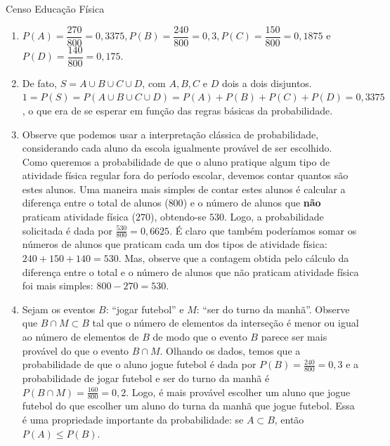 \begin{answer}{Censo Educação Física}
{
\begin{enumerate}
\item $P(A)=\dfrac{270}{800}=0{,}3375, P(B)=\dfrac{240}{800}=0{,}3, P(C)=\dfrac{150}{800}=0{,}1875$ e $P(D)=\dfrac{140}{800}=0{,}175$.

\item De fato, $S=A\cup B\cup C\cup D$, com $A, B, C $ e $D$ dois a dois disjuntos. $1=P(S)=P(A\cup B\cup C \cup D)=P(A)+P(B)+P(C)+P(D)=0{,}3375$, o que era de se esperar em função das regras básicas da probabilidade.

\item Observe que podemos usar a interpretação clássica de probabilidade, considerando cada aluno da escola igualmente provável de ser escolhido. Como queremos a probabilidade de que o aluno pratique algum tipo de atividade física regular fora do período escolar, devemos contar quantos são estes alunos. Uma maneira mais simples de contar estes alunos é calcular a diferença entre o total de alunos ($800$) e o número de alunos que \textbf{não} praticam atividade física ($270$), obtendo-se $530$. Logo, a probabilidade solicitada é dada por $\frac{530}{800}=0{,}6625$. É claro que também poderíamos somar os números de alunos que praticam cada um dos tipos de atividade física: $240+150+140=530$. Mas, observe que a contagem obtida pelo cálculo da diferença entre o total e o número de alunos que não praticam atividade física foi mais simples: $800−270=530$.

\item  Sejam os eventos $B$: “jogar futebol”{} e $M$: “ser do turno da manhã”. Observe que $B\cap M\subset B$ tal que o número de elementos da interseção é menor ou igual ao número de elementos de $B$ de modo que o evento $B$ parece ser mais provável do que o evento $B\cap M$. Olhando os dados, temos que a probabilidade de que o aluno jogue futebol é dada por $P(B)=\frac{240}{800}=0{,}3$ e a probabilidade de jogar futebol e ser do turno da manhã é $P(B\cap M)=\frac{160}{800}=0{,}2$. Logo, é mais provável escolher um aluno que jogue futebol do que escolher um aluno do turna da manhã que jogue futebol. Essa é uma propriedade importante da probabilidade: se $A\subset B$, então $P(A)\leq P(B)$.


\end{enumerate}}
\end{answer}
